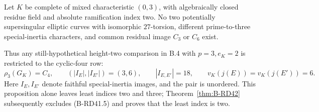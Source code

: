 \begin{proposition}
\label{prop:B-RD41}
Let $K$ be complete of mixed characteristic $(0,3)$, with algebraically
closed residue field and absolute ramification index two. No two
potentially supersingular elliptic curves with isomorphic $27$-torsion,
different prime-to-three special-inertia characters, and common
residual image $C_3$ or $C_6$ exist.

Thus any still-hypothetical height-two comparison in B.4 with
$p=3,e_K=2$ is restricted to the cyclic-four row:
\[
 \rho_3(G_K)=C_4,\qquad
 (|I_E|,|I_{E'}|)=(3,6),\qquad
 |I_{E,E'}|=18,\qquad
 v_K(j(E))=v_K(j(E'))=6.
                                                        \tag{B-RD41.5}
\]
Here $I_E,I_{E'}$ denote faithful special-inertia images, and the
pair is unordered. This proposition alone leaves least indices two
and three; Theorem~\ref{thm:B-RD42} subsequently excludes
(B-RD41.5) and proves that the least index is two.
\end{proposition}
